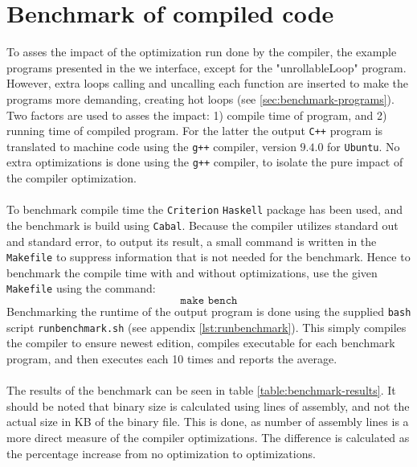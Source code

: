 \section{Benchmark of compiled code \rr}
To asses the impact of the optimization run done by the \lan compiler, the
example programs presented in the we interface, except for the "unrollableLoop" program.
However, extra loops calling and uncalling each function are inserted to make the programs
more demanding, creating hot loops
(see \ref{sec:benchmark-programs}). Two factors are used to asses the impact: 1) compile time
of program, and 2) running time of compiled program. For the latter the output \texttt{C++}
program is translated to machine code using the \texttt{g++} compiler, version $9.4.0$
for \texttt{Ubuntu}. No extra optimizations is done using the \texttt{g++} compiler, to
isolate the pure impact of the \lan compiler optimization.
\\
\\
To benchmark compile time the \texttt{Criterion} \texttt{Haskell} package has been used,
and the benchmark is build using \texttt{Cabal}. Because the \lan compiler utilizes
standard out and standard error, to output its result, a small command is written in the
\texttt{Makefile} to suppress information that is not needed for the benchmark. Hence
to benchmark the compile time with and without optimizations, use the given
\texttt{Makefile} using the command:
$$\texttt{make bench}$$
\noindent
Benchmarking the runtime of the output program is done using the supplied \texttt{bash}
script \texttt{runbenchmark.sh} (see appendix \ref{lst:runbenchmark}). This simply compiles
the \lan compiler to ensure newest edition, compiles executable for each benchmark program,
and then executes each 10 times and reports the average.
\\
\\
The results of the benchmark can be seen in table \ref{table:benchmark-results}.
It should be noted that binary size is calculated using lines of assembly, and not the
actual size in KB of the binary file. This is done, as number of assembly lines is a
more direct measure of the \lan compiler optimizations. The difference is calculated as
the percentage increase from no optimization to optimizations.

